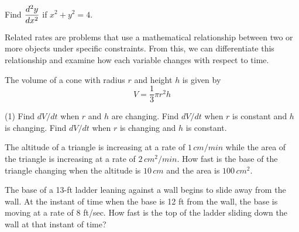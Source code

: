 \documentclass[../mathNotesPreamble]{subfiles}
\providecommand{\relscalefact}{1.4}
\begin{document}
  \begin{ex*}
    Find $\displaystyle\dydx[2]$ if $x^2+y^2=4$.
  \end{ex*}
  \pagebreak

  \begin{thmBox*}
    Related rates are problems that use a mathematical relationship between two or more objects under specific constraints. From this, we can differentiate this relationship and examine how each variable changes with respect to time.
  \end{thmBox*}

  The volume of a cone with radius $r$ and height $h$ is given by
    \[V=\frac{1}{3}\pi r^2h\]
  \begin{extasks}[after-item-skip=\stretch{1}](1)
    \task Find $dV/dt$ when $r$ and $h$ are changing.
    \task Find $dV/dt$ when $r$ is constant and $h$ is changing.
    \task Find $dV/dt$ when $r$ is changing and $h$ is constant.
  \end{extasks}
  \pagebreak

  \begin{ex*}
    The altitude of a triangle is increasing at a rate of $1\,cm/min$ while the area of the triangle is increasing at a rate of $2\,cm^2/min$. How fast is the base of the triangle changing when the altitude is $10\,cm$ and the area is $100\,cm^2$.
  \end{ex*}
  \begin{flushright}
  \end{flushright}
  \pagebreak

  \begin{ex*}
    The base of a 13-ft ladder leaning against a wall begins to slide away from the wall. At the instant of time when the base is 12 ft from the wall, the base is moving at a rate of 8 ft/sec. How fast is the top of the ladder sliding down the wall at that instant of time?
  \end{ex*}
  \pagebreak
\end{document}
